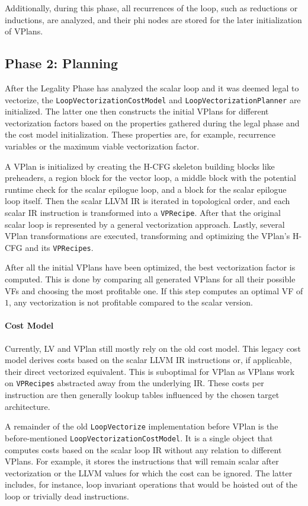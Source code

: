 \documentclass[sigplan,11pt,nonacm]{acmart}
\begin{document}
Additionally, during this phase, all recurrences of the loop, such as reductions or inductions, are analyzed,
and their phi nodes are stored for the later initialization of VPlans.

\subsection{Phase 2: Planning}
After the Legality Phase has analyzed the scalar loop and it was deemed legal to vectorize, the 
\texttt{LoopVectorizationCostModel} and \texttt{LoopVectorizationPlanner} are initialized.
The latter one then constructs the initial VPlans for different vectorization factors based on the properties 
gathered during the legal phase
and the cost model initialization. These properties are, for example, recurrence variables or the maximum viable 
vectorization factor.

A VPlan is initialized by creating the H-CFG skeleton building blocks like preheaders, a 
region block for the vector loop, a middle block with the potential runtime check for the scalar 
epilogue loop, and a block for the scalar epilogue loop itself. Then the scalar LLVM IR 
is iterated in topological order, and each scalar IR instruction is transformed into a \texttt{VPRecipe}.
After that the original scalar loop is represented by a general vectorization approach. Lastly, several VPlan 
transformations are executed, transforming and optimizing the VPlan's H-CFG and its \texttt{VPRecipes}.

After all the initial VPlans have been optimized, the best vectorization factor is computed. This is done 
by comparing all generated VPlans for all their possible VFs and choosing the most profitable one. If 
this step computes an optimal VF of $1$, any vectorization is not profitable compared to the 
scalar version.

\paragraph{Cost Model}
Currently, LV and VPlan still mostly rely on the old cost model. This legacy cost model derives costs 
based on the scalar LLVM IR instructions or, if applicable, their direct vectorized equivalent.
This is suboptimal for VPlan as VPlans work on \texttt{VPRecipes} abstracted away from the underlying 
IR. These costs per instruction are then generally lookup tables influenced by the chosen target 
architecture.

A remainder of the old \texttt{LoopVectorize} implementation before VPlan is the 
before-mentioned \texttt{LoopVectorizationCostModel}. It is a single object that computes costs based on the scalar loop 
IR without any relation to different VPlans. For example, it stores the instructions that will remain scalar 
after vectorization or the LLVM values for which the cost can 
be ignored. The latter includes, for instance, loop invariant operations that would be hoisted out of the loop 
or trivially dead instructions.
\end{document}
